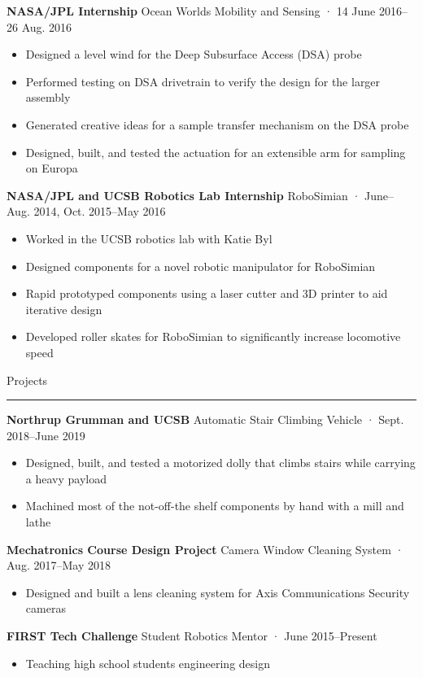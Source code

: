 \documentclass[12pt, oneside]{article}
\newcommand{\headingstyleJobs}[1] {
	{\fontsize{19pt}{1em}\selectfont \textcolor{new_red}{\textsf{#1}}}
	\textcolor{new_red}{\rule{3.25in}{0.5pt}} \vspace{3pt}
}
\newcommand{\jobtitle}[3] {
	{\bf #1} {#2} · {#3} \vspace{-10pt} \\
}
\begin{document}
\begin{flushleft}
\jobtitle{NASA/JPL Internship}{Ocean Worlds Mobility and Sensing}{14 June 2016–26 Aug. 2016}
\def\HrefFont{\em}
\begin{itemize}
	\item Designed a level wind for the Deep Subsurface Access (DSA) probe
	\item Performed testing on DSA drivetrain to verify the design for the larger assembly
	\item Generated creative ideas for a sample transfer mechanism on the DSA probe
	\item Designed, built, and tested the actuation for an extensible arm for sampling on Europa
\end{itemize}

\jobtitle{NASA/JPL and UCSB Robotics Lab Internship}{RoboSimian}{June–Aug. 2014, Oct. 2015–May 2016}
\begin{itemize}
	\item Worked in the UCSB robotics lab with Katie Byl
	\item Designed components for a novel robotic manipulator for RoboSimian
	\item Rapid prototyped components using a laser cutter and 3D printer to aid iterative design
	\item Developed roller skates for RoboSimian to significantly increase locomotive speed 
\end{itemize}


\headingstyleJobs{Projects}

\jobtitle{Northrup Grumman and UCSB}{Automatic Stair Climbing Vehicle}{Sept. 2018–June 2019}
\begin{itemize}
	\item Designed, built, and tested a motorized dolly that climbs stairs while carrying a heavy payload
	\item Machined most of the not-off-the shelf components by hand with a mill and lathe
\end{itemize}

\jobtitle{Mechatronics Course Design Project}{Camera Window Cleaning System}{Aug. 2017–May 2018}
\begin{itemize}
	\item Designed and built a lens cleaning system for Axis Communications Security cameras 
\end{itemize}

\jobtitle{FIRST Tech Challenge}{Student Robotics Mentor}{June 2015–Present}
\begin{itemize}
	\item Teaching high school students engineering design
\end{itemize}


\end{flushleft}
\end{document}
